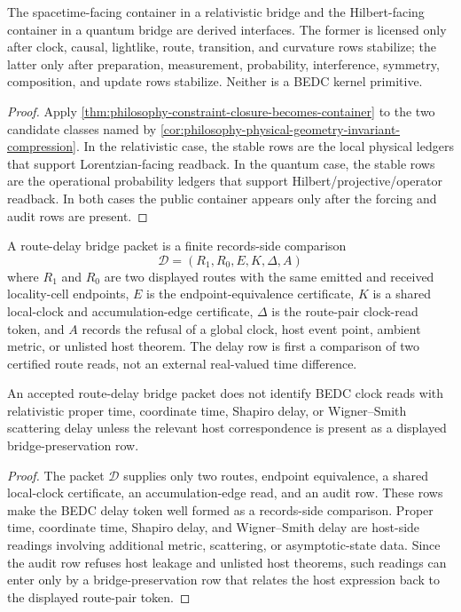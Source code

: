 \begin{corollary}
\label{cor:philosophy-relativistic-quantum-containers-derived}
The spacetime-facing container in a relativistic bridge and the
Hilbert-facing container in a quantum bridge are derived interfaces. The
former is licensed only after clock, causal, lightlike, route, transition,
and curvature rows stabilize; the latter only after preparation,
measurement, probability, interference, symmetry, composition, and update rows
stabilize. Neither is a BEDC kernel primitive.
\end{corollary}
\begin{proof}
Apply \autoref{thm:philosophy-constraint-closure-becomes-container} to the two
candidate classes named by \autoref{cor:philosophy-physical-geometry-invariant-compression}.
In the relativistic case, the stable rows are the local physical ledgers that
support Lorentzian-facing readback. In the quantum case, the stable rows are
the operational probability ledgers that support Hilbert/projective/operator
readback. In both cases the public container appears only after the forcing
and audit rows are present.
\end{proof}

\begin{definition}
\label{def:philosophy-route-delay-bridge-packet}
A route-delay bridge packet is a finite records-side comparison
$$
\mathcal{D}=(R_{1},R_{0},E,K,\Delta,A)
$$
where $R_{1}$ and $R_{0}$ are two displayed routes with the same emitted
and received locality-cell endpoints, $E$ is the endpoint-equivalence
certificate, $K$ is a shared local-clock and accumulation-edge
certificate, $\Delta$ is the route-pair clock-read token, and $A$ records
the refusal of a global clock, host event point, ambient metric, or
unlisted host theorem. The delay row is first a comparison of two
certified route reads, not an external real-valued time difference.
\end{definition}

\begin{theorem}
\label{thm:philosophy-route-delay-not-host-proper-time}
An accepted route-delay bridge packet does not identify BEDC clock reads
with relativistic proper time, coordinate time, Shapiro delay, or
Wigner--Smith scattering delay unless the relevant host correspondence
is present as a displayed bridge-preservation row.
\end{theorem}
\begin{proof}
The packet $\mathcal{D}$ supplies only two routes, endpoint equivalence,
a shared local-clock certificate, an accumulation-edge read, and an
audit row. These rows make the BEDC delay token well formed as a
records-side comparison. Proper time, coordinate time, Shapiro delay,
and Wigner--Smith delay are host-side readings involving additional
metric, scattering, or asymptotic-state data. Since the audit row refuses
host leakage and unlisted host theorems, such readings can enter only by
a bridge-preservation row that relates the host expression back to the
displayed route-pair token.
\end{proof}

